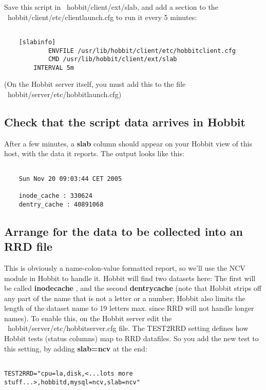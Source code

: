  Save this script in ~hobbit/client/ext/slab, and add a section to the
 ~hobbit/client/etc/clientlaunch.cfg to run it every 5 minutes:
 \begin{verbatim}

	[slabinfo]
        	ENVFILE /usr/lib/hobbit/client/etc/hobbitclient.cfg
	        CMD /usr/lib/hobbit/client/ext/slab
		INTERVAL 5m

\end{verbatim}

 (On the Hobbit server itself, you must add this to the file ~hobbit/server/etc/hobbitlaunch.cfg) 
\subsection{Check that the script data arrives in Hobbit}


 After a few minutes, a \textbf{slab}
 column should appear on your Hobbit view of this host, with the data it reports. The output looks like this: \begin{verbatim}

	Sun Nov 20 09:03:44 CET 2005

	inode_cache : 330624
	dentry_cache : 40891068

\end{verbatim}

\subsection{Arrange for the data to be collected into an RRD file}


 This is obviously a name-colon-value formatted report, so we'll use the NCV module in Hobbit to handle it. Hobbit will find two datasets here: The first will be called \textbf{inodecache}
, and the second \textbf{dentrycache}
 (note that Hobbit strips off any part of the name that is not a letter or a number; Hobbit also limits the length of the dataset name to 19 letters max. since RRD will not handle longer names). To enable this, on the Hobbit server edit the ~hobbit/server/etc/hobbitserver.cfg file. The TEST2RRD setting defines how Hobbit tests (status columns) map to RRD datafiles. So you add the new test to this setting, by adding \textbf{slab=ncv}
 at the end: \begin{verbatim}

TEST2RRD="cpu=la,disk,<...lots more stuff...>,hobbitd,mysql=ncv,slab=ncv"

\end{verbatim}



